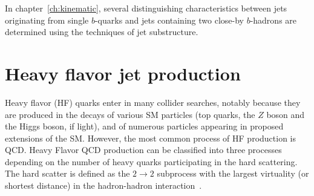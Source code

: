 

In chapter~\ref{ch:kinematic}, several distinguishing characteristics between jets originating from single $b$-quarks and jets containing two close-by  $b$-hadrons are determined using the techniques of jet substructure. 







\section{Heavy flavor jet production}%

Heavy flavor  (HF) quarks enter in many collider searches, notably because they are produced in the decays of various SM particles (top quarks, the $Z$ boson and the Higgs boson, if light), and of numerous particles appearing in proposed extensions of the SM. However, the most common process of HF production is QCD. Heavy Flavor QCD production can be classified into three processes 
depending on the number of heavy quarks participating in the hard scattering. The hard scatter is defined as the $2 \rightarrow 2$ subprocess with the largest virtuality (or shortest distance) in the hadron-hadron interaction~\cite{Norrbin:2000zc}.



